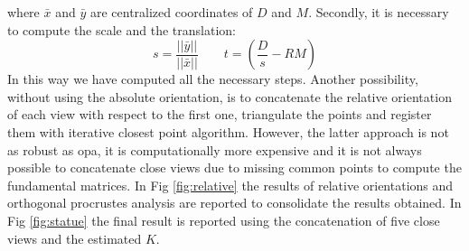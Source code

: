 \documentclass[11pt]{article}
\begin{document}
where $\bar{x}$ and $\bar{y}$ are centralized coordinates of $D$ and $M$.
Secondly, it is necessary to compute the scale and the translation:
\begin{equation}
    s = \frac{||\bar{y}||}{||\bar{x}||} \qquad t=\left(\frac{D}{s} - RM\right)
\end{equation}
In this way we have computed all the necessary steps. Another possibility, without using the absolute orientation, is to concatenate the relative orientation of each view with respect to the first one, triangulate the points and register them with iterative closest point algorithm. However, the latter approach is not as robust as opa, it is computationally more expensive and it is not always possible to concatenate close views due to missing common points to compute the fundamental matrices.
In Fig \ref{fig:relative} the results of relative orientations and orthogonal procrustes analysis are reported to consolidate the results obtained. In Fig \ref{fig:statue} the final result is reported using the concatenation of five close views and the estimated $K$.
\bigskip
\bigskip
\end{document}
